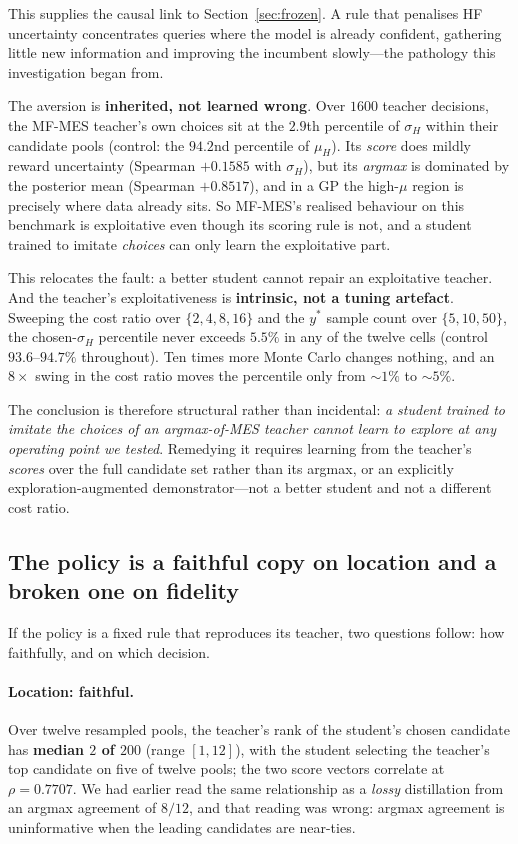 \documentclass[11pt]{article}
\begin{document}
This supplies the causal link to Section~\ref{sec:frozen}. A rule that penalises
HF uncertainty concentrates queries where the model is already confident,
gathering little new information and improving the incumbent slowly---the
pathology this investigation began from.

The aversion is \textbf{inherited, not learned wrong}. Over $1600$ teacher
decisions, the MF-MES teacher's own choices sit at the $2.9$th percentile of
$\sigma_H$ within their candidate pools (control: the $94.2$nd percentile of
$\mu_H$). Its \emph{score} does mildly reward uncertainty
(Spearman $+0.1585$ with $\sigma_H$), but its \emph{argmax} is dominated by the
posterior mean (Spearman $+0.8517$), and in a GP the high-$\mu$ region is
precisely where data already sits. So MF-MES's realised behaviour on this
benchmark is exploitative even though its scoring rule is not, and a student
trained to imitate \emph{choices} can only learn the exploitative part.

This relocates the fault: a better student cannot repair an exploitative teacher.
And the teacher's exploitativeness is \textbf{intrinsic, not a tuning artefact}.
Sweeping the cost ratio over $\{2,4,8,16\}$ and the $y^\ast$ sample count over
$\{5,10,50\}$, the chosen-$\sigma_H$ percentile never exceeds $5.5\%$ in any of
the twelve cells (control $93.6$--$94.7\%$ throughout). Ten times more Monte
Carlo changes nothing, and an $8\times$ swing in the cost ratio moves the
percentile only from ${\sim}1\%$ to ${\sim}5\%$.

The conclusion is therefore structural rather than incidental: \emph{a student
trained to imitate the choices of an argmax-of-MES teacher cannot learn to
explore at any operating point we tested}. Remedying it requires learning from
the teacher's \emph{scores} over the full candidate set rather than its argmax,
or an explicitly exploration-augmented demonstrator---not a better student and
not a different cost ratio.

\subsection{The policy is a faithful copy on location and a broken one on fidelity}
\label{sec:fidelity}

If the policy is a fixed rule that reproduces its teacher, two questions follow:
how faithfully, and on which decision.

\paragraph{Location: faithful.} Over twelve resampled pools, the teacher's rank
of the student's chosen candidate has \textbf{median $2$ of $200$}
(range $[1,12]$), with the student selecting the teacher's top candidate on five
of twelve pools; the two score vectors correlate at $\rho = 0.7707$. We had
earlier read the same relationship as a \emph{lossy} distillation from an argmax
agreement of $8/12$, and that reading was wrong: argmax agreement is
uninformative when the leading candidates are near-ties.
\end{document}
